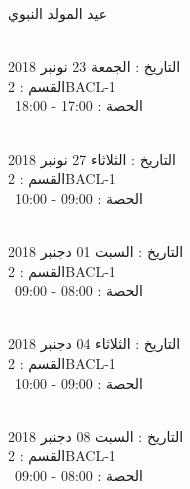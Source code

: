 \indent
  عيد المولد النبوي
\par
\noindent\makebox[\linewidth]{\rule{\paperwidth}{0.4pt}}
 \\
التاريخ : الجمعة 23 نونبر 2018 \\
القسم : 2BACL-1 \\
 \  
الحصة : 17:00 - 18:00 \\
\par
\noindent\makebox[\linewidth]{\rule{\paperwidth}{0.4pt}}
 \\
التاريخ : الثلاثاء 27 نونبر 2018 \\
القسم : 2BACL-1 \\
 \  
الحصة : 09:00 - 10:00 \\
\par
\noindent\makebox[\linewidth]{\rule{\paperwidth}{0.4pt}}
 \\
التاريخ : السبت 01 دجنبر 2018 \\
القسم : 2BACL-1 \\
 \  
الحصة : 08:00 - 09:00 \\
\par
\noindent\makebox[\linewidth]{\rule{\paperwidth}{0.4pt}}
 \\
التاريخ : الثلاثاء 04 دجنبر 2018 \\
القسم : 2BACL-1 \\
 \  
الحصة : 09:00 - 10:00 \\
\par
\noindent\makebox[\linewidth]{\rule{\paperwidth}{0.4pt}}
 \\
التاريخ : السبت 08 دجنبر 2018 \\
القسم : 2BACL-1 \\
 \  
الحصة : 08:00 - 09:00 \\
